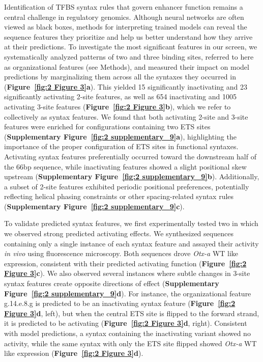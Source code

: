 Identification of TFBS syntax rules that govern enhancer function remains a central challenge in regulatory genomics\cite{Jindal2021-zk}. Although neural networks are often viewed as black boxes, methods for interpreting trained models can reveal the sequence features they prioritize and help us better understand how they arrive at their predictions\cite{Novakovsky2022-ft}. To investigate the most significant features in our screen, we systematically analyzed patterns of two and three binding sites, referred to here as organizational features (see Methods), and measured their impact on model predictions by marginalizing them across all the syntaxes they occurred in (\textbf{Figure~\ref{fig:2 Figure 3}a}). This yielded 15 significantly inactivating and 23 significantly activating 2-site features, as well as 654 inactivating and 1005 activating 3-site features (\textbf{Figure~\ref{fig:2 Figure 3}b}), which we refer to collectively as syntax features. We found that both activating 2-site and 3-site features were enriched for configurations containing two ETS sites (\textbf{Supplementary Figure~\ref{fig:2 supplementary_9}a}), highlighting the importance of the proper configuration of ETS sites in functional syntaxes. Activating syntax features preferentially occurred toward the downstream half of the 66bp sequence, while inactivating features showed a slight positional skew upstream (\textbf{Supplementary Figure~\ref{fig:2 supplementary_9}b}). Additionally, a subset of 2-site features exhibited periodic positional preferences, potentially reflecting helical phasing constraints or other spacing-related syntax rules (\textbf{Supplementary Figure~\ref{fig:2 supplementary_9}c}).

To validate predicted syntax features, we first experimentally tested two in which we observed strong predicted activating effects. We synthesized sequences containing only a single instance of each syntax feature and assayed their activity \textit{in vivo} using fluorescence microscopy. Both sequences drove \textit{Otx-a} WT like expression, consistent with their predicted activating function (\textbf{Figure~\ref{fig:2 Figure 3}c}). We also observed several instances where subtle changes in 3-site syntax features create opposite directions of effect (\textbf{Supplementary Figure~\ref{fig:2 supplementary_9}d}). For instance, the organizational feature g.14.e.8.g is predicted to be an inactivating syntax feature (\textbf{Figure~\ref{fig:2 Figure 3}d}, left), but when the central ETS site is flipped to the forward strand, it is predicted to be activating (\textbf{Figure~\ref{fig:2 Figure 3}d}, right). Consistent with model predictions, a syntax containing the inactivating variant showed no activity, while the same syntax with only the ETS site flipped showed \textit{Otx-a} WT like expression (\textbf{Figure~\ref{fig:2 Figure 3}d}).

